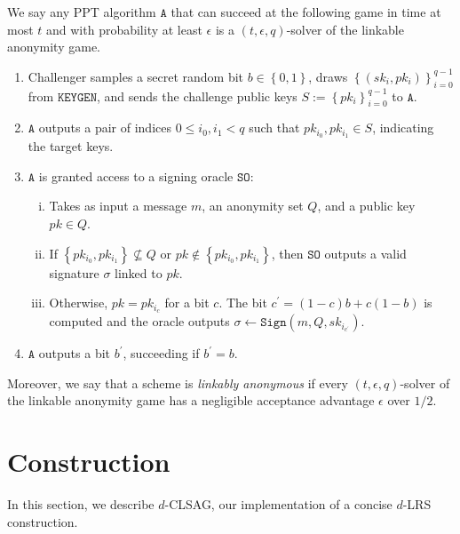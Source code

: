 \documentclass{llncs}
\begin{document}
\begin{definition}\label{linkable-anonymity-game}
We say any PPT algorithm $\texttt{A}$ that can succeed at the following game in time at most $t$ and with probability at least $\epsilon$ is a $(t, \epsilon, q)$-solver of the linkable anonymity game.
\begin{enumerate}
\item Challenger samples a secret random bit $b \in \left\{0,1\right\}$, draws $\left\{(sk_i, pk_i)\right\}_{i=0}^{q-1}$ from $\texttt{KEYGEN}$, and sends the challenge public keys $S := \left\{pk_i\right\}_{i=0}^{q-1}$ to $\texttt{A}$.

\item $\texttt{A}$ outputs a pair of indices $0 \leq i_0, i_1 < q$ such that $pk_{i_0}, pk_{i_1} \in S$, indicating the target keys.

\item  $\texttt{A}$ is granted access to a signing oracle $\texttt{SO}$:
    \begin{enumerate}[(i)]
    \item Takes as input a message $m$, an anonymity set $Q$, and a public key $pk \in Q$.

    \item If $\left\{pk_{i_0}, pk_{i_1}\right\} \not\subseteq Q$ or $pk \notin \left\{pk_{i_0}, pk_{i_1}\right\}$, then $\texttt{SO}$ outputs a valid signature $\sigma$ linked to $pk$.

    \item Otherwise, $pk = pk_{i_c}$ for a bit $c$. The bit $c^\prime = (1-c)b + c(1-b)$ is computed and the oracle outputs $\sigma \leftarrow \texttt{Sign}(m, Q, sk_{i_{c^\prime}})$.
    \end{enumerate}

\item $\texttt{A}$ outputs a bit $b^\prime$, succeeding if $b^\prime = b$.
\end{enumerate}
Moreover, we say that a scheme is \textit{linkably anonymous} if every $(t, \epsilon, q)$-solver of the linkable anonymity game has a negligible acceptance advantage $\epsilon$ over $1/2$.
\end{definition}


\section{Construction}\label{sec:implementation}

In this section, we describe $d$-CLSAG, our implementation of a concise $d$-LRS construction.
\end{document}
